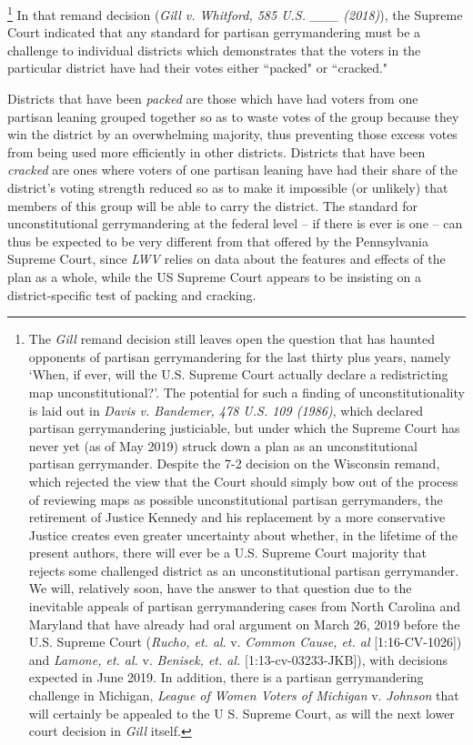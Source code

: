         \footnote{The \textit{Gill} remand decision still leaves open the question that has haunted opponents of partisan gerrymandering for the last thirty plus years, namely `When, if ever, will the U.S. Supreme Court actually declare a redistricting map unconstitutional?'.  The potential for such a finding of unconstitutionality is laid out in \textit{Davis v. Bandemer, 478 U.S. 109 (1986)}, which declared partisan gerrymandering justiciable, but under which the Supreme Court has never yet (as of May 2019) struck down a plan as an unconstitutional partisan gerrymander. Despite the 7-2 decision on the Wisconsin remand, which rejected the view that the Court should simply bow out of the process of reviewing maps as possible unconstitutional partisan gerrymanders, the retirement of Justice Kennedy and his replacement by a more conservative Justice creates even greater uncertainty about whether, in the lifetime of the present authors, there will ever be a U.S. Supreme Court majority that rejects some challenged district as an unconstitutional partisan gerrymander. We will, relatively soon, have the answer to that question due to the inevitable appeals of partisan gerrymandering cases from North Carolina and Maryland that have already had oral argument on March 26, 2019 before the U.S. Supreme Court (\textit{Rucho, et. al}. v. \textit{Common Cause, et. al} [1:16-CV-1026]) and \textit{Lamone, et. al.} v. \textit{Benisek, et. al.} [1:13-cv-03233-JKB]), with decisions expected in June 2019. In addition, there is a partisan gerrymandering challenge in Michigan, \textit{League of Women Voters of Michigan} v. \textit{Johnson} that will certainly be appealed to the U S. Supreme Court, as will the next lower court decision in \textit{Gill} itself.}
    In that remand decision (\textit{Gill v. Whitford, 585 U.S. \_\_\_ (2018)}), the Supreme Court indicated that any standard for partisan gerrymandering must be a challenge to individual districts which demonstrates that the voters in the particular district have had their votes either ``packed" or ``cracked."
\par
    Districts that have been \textit{packed} are those which have had voters from one partisan leaning grouped together so as to waste votes of the group because they win the district by an overwhelming majority, thus preventing those  excess votes from being used more efficiently in other districts. Districts that have been \textit{cracked} are ones where voters of one partisan leaning have had their share of the district’s voting strength reduced so as to make it impossible (or unlikely) that members of this group will be able to carry the district. The standard for unconstitutional gerrymandering at the federal level -- if there is ever is one -- can thus be expected to be very different from that offered by the Pennsylvania Supreme Court, since \textit{LWV} relies on data about the features and effects of the plan as a whole, while the US Supreme Court appears to be insisting on a district-specific test of packing and cracking. 
